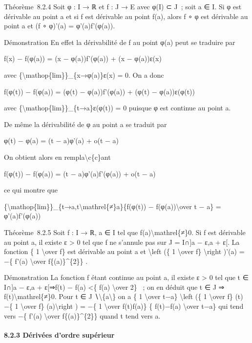 \documentclass[]{article}
\begin{document}
Théorème~8.2.4 Soit φ : I → ℝ et f : J → E avec φ(I) ⊂ J~; soit a ∈ I.
Si φ est dérivable au point a et si f est dérivable au point f(a), alors
f ∘ φ est dérivable au point a et (f ∘ φ)'(a) = φ'(a)f'(φ(a)).

Démonstration En effet la dérivabilité de f au point φ(a) peut se
traduire par

f(x) − f(φ(a)) = (x − φ(a))f'(φ(a)) + (x − φ(a))ε(x)

avec \{\textbackslash{}mathop\{lim\}\}\_\{x→φ(a)\}ε(x) = 0. On a donc

f(φ(t)) − f(φ(a)) = (φ(t) − φ(a))f'(φ(a)) + (φ(t) − φ(a))ε(φ(t))

avec \{\textbackslash{}mathop\{lim\}\}\_\{t→a\}ε(φ(t)) = 0 puisque φ est
continue au point a.

De même la dérivabilité de φ au point a se traduit par

φ(t) − φ(a) = (t − a)φ'(a) + o(t − a)

On obtient alors en rempla\textbackslash{}c\{c\}ant

f(φ(t)) − f(φ(a)) = (t − a)φ'(a)f'(φ(a)) + o(t − a)

ce qui montre que

\{\textbackslash{}mathop\{lim\}\}\_\{t→a,t\textbackslash{}mathrel\{≠\}a\}\{f(φ(t))
− f(φ(a))\textbackslash{}over t − a\} = φ'(a)f'(φ(a))

Théorème~8.2.5 Soit f : I → ℝ, a ∈ I tel que
f(a)\textbackslash{}mathrel\{≠\}0. Si f est dérivable au point a, il
existe ε \textgreater{} 0 tel que f ne s'annule pas sur J = I∩{]}a − ε,a
+ ε{[}. La fonction \{ 1 \textbackslash{}over f\} est dérivable au point
a et \textbackslash{}left (\{ 1 \textbackslash{}over f\}
\textbackslash{}right )'(a) = −\{ f'(a) \textbackslash{}over
f\{(a)\}\^{}\{2\}\} .

Démonstration La fonction f étant continue au point a, il existe ε
\textgreater{} 0 tel que t ∈ I∩{]}a − ε,a + ε{[}⇒\textbar{}f(t) −
f(a)\textbar{} \textless{}\{ \textbar{}f(a)\textbar{}
\textbackslash{}over 2\} ~; on en déduit que t ∈ J ⇒
f(t)\textbackslash{}mathrel\{≠\}0. Pour t ∈ J
∖\textbackslash{}\{a\textbackslash{}\} on a \{ 1 \textbackslash{}over
t−a\} \textbackslash{}left (\{ 1 \textbackslash{}over f\} (t) −\{ 1
\textbackslash{}over f\} (a)\textbackslash{}right ) = −\{ 1
\textbackslash{}over f(t)f(a)\} \{ f(t)−f(a) \textbackslash{}over t−a\}
qui tend vers −\{ f'(a) \textbackslash{}over f\{(a)\}\^{}\{2\}\} quand t
tend vers a.

\paragraph{8.2.3 Dérivées d'ordre supérieur}
\end{document}
